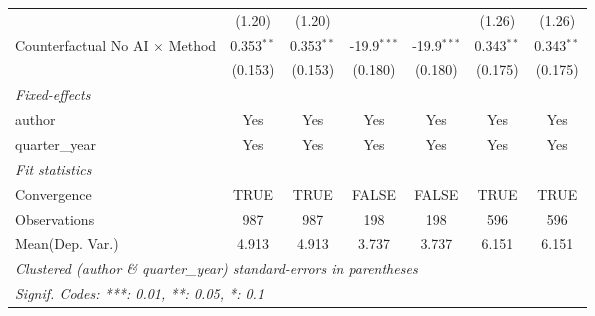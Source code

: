 \begin{tabular}{lcccccc}
                                         & (1.20)        & (1.20)        &               &               & (1.26)        & (1.26)\\   
   Counterfactual No AI $\times$ Method  & 0.353$^{**}$  & 0.353$^{**}$  & -19.9$^{***}$ & -19.9$^{***}$ & 0.343$^{**}$  & 0.343$^{**}$\\   
                                         & (0.153)       & (0.153)       & (0.180)       & (0.180)       & (0.175)       & (0.175)\\   
   \midrule
   \emph{Fixed-effects}\\
   author                                & Yes           & Yes           & Yes           & Yes           & Yes           & Yes\\  
   quarter\_year                         & Yes           & Yes           & Yes           & Yes           & Yes           & Yes\\  
   \midrule
   \emph{Fit statistics}\\
   Convergence                           &TRUE           & TRUE          & FALSE         & FALSE         & TRUE          & TRUE\\  
   Observations                          & 987           & 987           & 198           & 198           & 596           & 596\\  
Mean(Dep. Var.) & 4.913 & 4.913 & 3.737 & 3.737 & 6.151 & 6.151 \\
   \midrule \midrule
   \multicolumn{7}{l}{\emph{Clustered (author \& quarter\_year) standard-errors in parentheses}}\\
   \multicolumn{7}{l}{\emph{Signif. Codes: ***: 0.01, **: 0.05, *: 0.1}}\\
\end{tabular}
\par\endgroup
